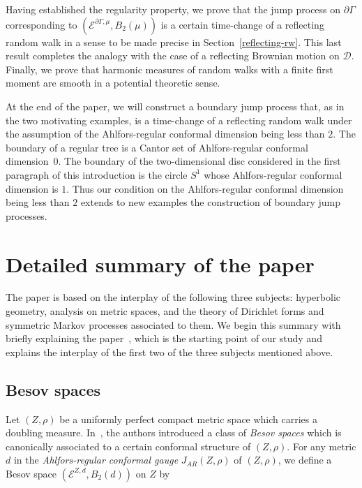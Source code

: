 \documentclass[10pt]{amsart}
\theoremstyle{definition}\newtheorem{defi}[theo]{Definition}\newtheorem{rema}[theo]{Remark}\newtheorem{exam}[theo]{Example}\newtheorem{exem}[theo]{Example}\newtheorem{nota}[theo]{Notation}
\newcommand{\ce}{\mathcal{E}}
\newcommand{\cd}{\mathcal{D}}
\begin{document}
Having established the regularity property, we prove that the jump process on $\partial\Gamma$ corresponding to $(\ce^{\partial\Gamma,\mu}, B_2(\mu))$ is a certain time-change of a reflecting random walk in a sense to be made precise in Section~\ref{reflecting-rw}. This last result completes the analogy with the case of a reflecting Brownian motion on $\cd$. Finally, we prove that harmonic measures of random walks with a finite first moment are smooth in a potential theoretic sense.

At the end of the paper, we will construct a boundary jump process that, as in the two motivating examples, is a time-change of a reflecting random walk under the assumption of the Ahlfors-regular conformal dimension being less than $2$. The boundary of a regular tree is a Cantor set of Ahlfors-regular conformal dimension~$0$. The boundary of the two-dimensional disc considered in the first paragraph of this introduction is the circle $S^1$ whose Ahlfors-regular conformal dimension is $1$. Thus our condition on the Ahlfors-regular conformal dimension being less than $2$ extends to new examples the construction of boundary jump processes.



\section{Detailed summary of the paper}\label{summary}
The paper is based on the interplay of the following three subjects: hyperbolic geometry, analysis on metric spaces, and the theory of Dirichlet forms and symmetric Markov processes associated to them. We begin this summary with briefly explaining the paper~\cite{BP}, which is the starting point of our study and explains the interplay of the first two of the three subjects mentioned above.

\subsection*{Besov spaces}
Let $(Z,\rho)$ be a uniformly perfect compact metric space which carries a doubling measure. In~\cite{BP}, the authors introduced a class of \emph{Besov spaces} which is canonically associated to a certain conformal structure of $(Z,\rho)$. For any metric $d$ in the \emph{Ahlfors-regular conformal gauge} $J_{AR}(Z,\rho)$ of $(Z,\rho)$, we define a Besov space $(\ce^{Z,d},B_2(d))$ on $Z$ by
\end{document}
